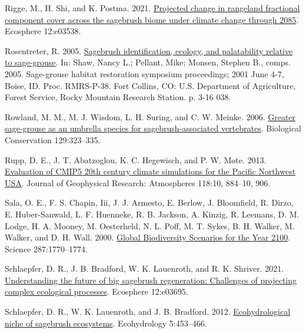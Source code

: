 \documentclass[
  12pt,
]{article}
\newlength{\cslhangindent}
\newlength{\cslentryspacingunit} %
\newenvironment{CSLReferences}[2] %
 {%
  \setlength{\parindent}{0pt}
  \ifodd #1
  \let\oldpar\par
  \def\par{\hangindent=\cslhangindent\oldpar}
  \fi
  \setlength{\parskip}{#2\cslentryspacingunit}
 }%
 {}
\begin{document}
\begin{CSLReferences}{1}{0}
\leavevmode{}%
Rigge, M., H. Shi, and K. Postma. 2021. \href{https://doi.org/10.1002/ecs2.3538}{Projected change in rangeland fractional component cover across the sagebrush biome under climate change through 2085}. Ecosphere 12:e03538.

\leavevmode{}%
Rosentreter, R. 2005. \href{https://www.fs.usda.gov/treesearch/pubs/21434}{Sagebrush identification, ecology, and palatability relative to sage-grouse}. In: Shaw, Nancy L.; Pellant, Mike; Monsen, Stephen B., comps. 2005. Sage-grouse habitat restoration symposium proceedings; 2001 June 4-7, Boise, ID. Proc. RMRS-P-38. Fort Collins, CO: U.S. Department of Agriculture, Forest Service, Rocky Mountain Research Station. p. 3-16 038.

\leavevmode{}%
Rowland, M. M., M. J. Wisdom, L. H. Suring, and C. W. Meinke. 2006. \href{https://doi.org/10.1016/j.biocon.2005.10.048}{Greater sage-grouse as an umbrella species for sagebrush-associated vertebrates}. Biological Conservation 129:323--335.

\leavevmode{}%
Rupp, D. E., J. T. Abatzoglou, K. C. Hegewisch, and P. W. Mote. 2013. \href{https://doi.org/10.1002/jgrd.50843}{Evaluation of {CMIP5} 20th century climate simulations for the {Pacific} {Northwest} {USA}}. Journal of Geophysical Research: Atmospheres 118:10, 884--10, 906.

\leavevmode{}%
Sala, O. E., F. S. Chapin, Iii, J. J. Armesto, E. Berlow, J. Bloomfield, R. Dirzo, E. Huber-Sanwald, L. F. Huenneke, R. B. Jackson, A. Kinzig, R. Leemans, D. M. Lodge, H. A. Mooney, M. Oesterheld, N. L. Poff, M. T. Sykes, B. H. Walker, M. Walker, and D. H. Wall. 2000. \href{https://doi.org/10.1126/science.287.5459.1770}{Global {Biodiversity} {Scenarios} for the {Year} 2100}. Science 287:1770--1774.

\leavevmode{}%
Schlaepfer, D. R., J. B. Bradford, W. K. Lauenroth, and R. K. Shriver. 2021. \href{https://doi.org/10.1002/ecs2.3695}{Understanding the future of big sagebrush regeneration: Challenges of projecting complex ecological processes}. Ecosphere 12:e03695.

\leavevmode{}%
Schlaepfer, D. R., W. K. Lauenroth, and J. B. Bradford. 2012. \href{https://doi.org/10.1002/eco.238}{Ecohydrological niche of sagebrush ecosystems}. Ecohydrology 5:453--466.


\end{CSLReferences}
\end{document}
